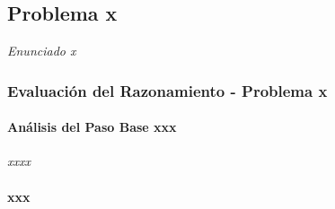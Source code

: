 \documentclass{article}
\begin{document}
\subsection{Problema x}
\label{sec:problema-x}
\textit{Enunciado x}
\bigskip
\subsubsection{Evaluación del Razonamiento - Problema x}
\label{sec:evaluacion-x}
\bigskip
\paragraph{Análisis del Paso Base xxx}
\textit{xxxx}
\paragraph{xxx}
\end{document}
